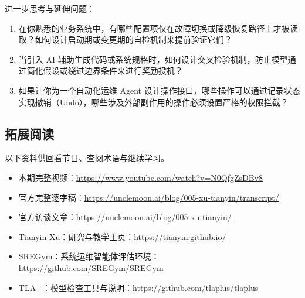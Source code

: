 \documentclass[UTF8,a4paper,11pt,fontset=fandol]{ctexart}
\begin{document}
进一步思考与延伸问题：
\begin{enumerate}
\item 在你熟悉的业务系统中，有哪些配置项仅在故障切换或降级恢复路径上才被读取？如何设计启动期或变更期的自检机制来提前验证它们？
\item 当引入 AI 辅助生成代码或系统规格时，如何设计交叉检验机制，防止模型通过简化假设或绕过边界条件来进行奖励投机？
\item 如果让你为一个自动化运维 Agent 设计操作接口，哪些操作可以通过记录状态实现撤销（Undo），哪些涉及外部副作用的操作必须设置严格的权限拦截？
\end{enumerate}
\subsection{拓展阅读}
以下资料供回看节目、查阅术语与继续学习。
\begin{itemize}
\item 本期完整视频：\url{https://www.youtube.com/watch?v=N0QfgZsDBv8}
\item 官方完整逐字稿：\url{https://unclemoon.ai/blog/005-xu-tianyin/transcript/}
\item 官方访谈文章：\url{https://unclemoon.ai/blog/005-xu-tianyin/}
\item Tianyin Xu：研究与教学主页：\url{https://tianyin.github.io/}
\item SREGym：系统运维智能体评估环境：\url{https://github.com/SREGym/SREGym}
\item TLA+：模型检查工具与说明：\url{https://github.com/tlaplus/tlaplus}
\end{itemize}
\end{document}
